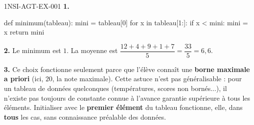 \begin{corrige}{1NSI-AGT-EX-001}
\textbf{1.}
\begin{python}
def minimum(tableau):
    mini = tableau[0]
    for x in tableau[1:]:
        if x < mini:
            mini = x
    return mini
\end{python}

\textbf{2.} Le minimum est $1$. La moyenne est
$\dfrac{12+4+9+1+7}{5}=\dfrac{33}{5}=6{,}6$.

\textbf{3.} Ce choix fonctionne seulement parce que l'élève connaît une \textbf{borne
maximale a priori} (ici, $20$, la note maximale). Cette astuce n'est pas généralisable :
pour un tableau de données quelconques (températures, scores non bornés...), il n'existe
pas toujours de constante connue à l'avance garantie supérieure à tous les éléments.
Initialiser avec le \textbf{premier élément} du tableau fonctionne, elle, dans
\textbf{tous} les cas, sans connaissance préalable des données.
\end{corrige}
